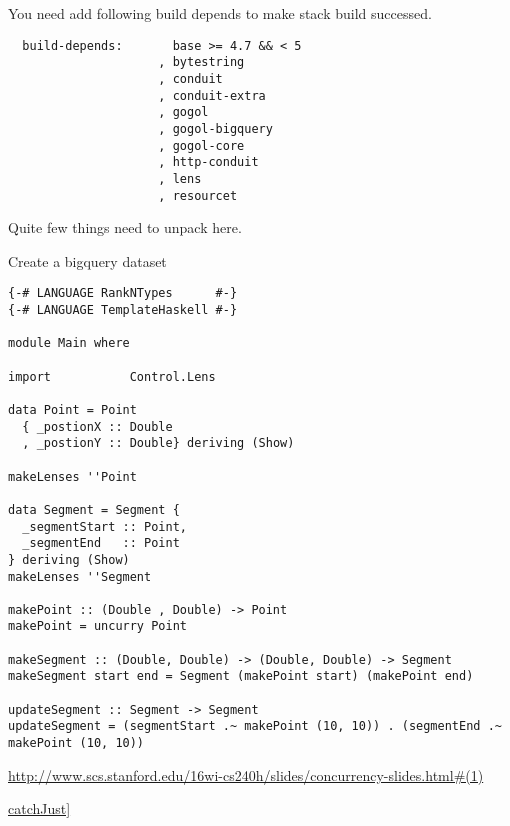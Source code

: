 You need add following build depends to make stack build successed.

\begin{verbatim}
  build-depends:       base >= 4.7 && < 5
                     , bytestring
                     , conduit
                     , conduit-extra
                     , gogol
                     , gogol-bigquery
                     , gogol-core
                     , http-conduit
                     , lens
                     , resourcet
\end{verbatim}

Quite few things need to unpack here.

Create a bigquery dataset


\begin{verbatim}
{-# LANGUAGE RankNTypes      #-}
{-# LANGUAGE TemplateHaskell #-}

module Main where

import           Control.Lens

data Point = Point
  { _postionX :: Double
  , _postionY :: Double} deriving (Show)

makeLenses ''Point

data Segment = Segment {
  _segmentStart :: Point,
  _segmentEnd   :: Point
} deriving (Show)
makeLenses ''Segment

makePoint :: (Double , Double) -> Point
makePoint = uncurry Point

makeSegment :: (Double, Double) -> (Double, Double) -> Segment
makeSegment start end = Segment (makePoint start) (makePoint end)

updateSegment :: Segment -> Segment
updateSegment = (segmentStart .~ makePoint (10, 10)) . (segmentEnd .~ makePoint (10, 10))
\end{verbatim}



\url{http://www.scs.stanford.edu/16wi-cs240h/slides/concurrency-slides.html#(1)}

\href{https://hackage.haskell.org/package/base-4.10.0.0/docs/Control-Exception.html#v:catchJust}{catchJust]}





